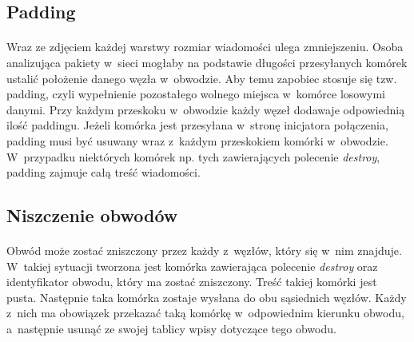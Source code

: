 \subsection{Padding}\paragraph{}
Wraz ze zdjęciem każdej warstwy rozmiar wiadomości ulega zmniejszeniu. Osoba analizująca pakiety w~sieci mogłaby na podstawie długości przesyłanych komórek ustalić położenie danego węzła w~obwodzie. Aby temu zapobiec stosuje się tzw. padding, czyli wypełnienie pozostałego wolnego miejsca w~komórce losowymi danymi. Przy każdym przeskoku w~obwodzie każdy węzeł dodawaje odpowiednią ilość paddingu. Jeżeli komórka jest przesyłana w~stronę inicjatora połączenia, padding musi być usuwany wraz z~każdym przeskokiem komórki w~obwodzie. W~przypadku niektórych komórek np. tych zawierających polecenie \textit{destroy}, padding zajmuje całą treść wiadomości\cite{hiding_routing_information}.

\subsection{Niszczenie obwodów}\paragraph{}
Obwód może zostać zniszczony przez każdy z~węzłów, który się w~nim znajduje. W~takiej sytuacji tworzona jest komórka zawierająca polecenie \textit{destroy} oraz identyfikator obwodu, który ma zostać zniszczony. Treść takiej komórki jest pusta. Następnie taka komórka zostaje wysłana do obu sąsiednich węzłów. Każdy z~nich ma obowiązek przekazać taką komórkę w~odpowiednim kierunku obwodu, a~następnie usunąć ze swojej tablicy wpisy dotyczące tego obwodu\cite{hiding_routing_information}.

